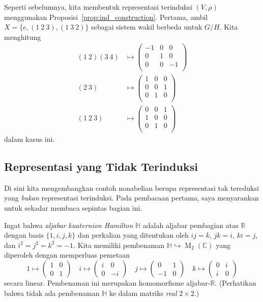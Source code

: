 \documentclass[12pt]{article}
\theoremstyle{plain}
\theoremstyle{definition}
\theoremstyle{remark}
\numberwithin{equation}{section}
\begin{document}
Seperti sebelumnya, kita membentuk representasi terinduksi $(V,\rho)$ menggunakan
Proposisi~\ref{prop:ind_construction}.
Pertama, ambil $X=\{ e, (1\ 2\ 3), (1\ 3\ 2) \}$ sebagai sistem
wakil berbeda untuk $G/H$.
Kita menghitung
\begin{align*}
(1\ 2)(3\ 4)&\mapsto
\begin{pmatrix}
-1 & 0 & 0\\
0 & 1 & 0\\
0 & 0 & -1\\
\end{pmatrix}\\
(2\ 3)&\mapsto
\begin{pmatrix}
1 & 0 & 0\\
0 & 0 & 1\\
0 & 1 & 0\\
\end{pmatrix}\\
(1\ 2\ 3)&\mapsto
\begin{pmatrix}
0 & 0 & 1\\
1 & 0 & 0\\
0 & 1 & 0\\
\end{pmatrix}
\end{align*}
dalam kasus ini.

\subsection{Representasi yang Tidak Terinduksi}

Di sini kita mengembangkan contoh nonabelian berupa representasi tak tereduksi
yang \emph{bukan} representasi terinduksi.
Pada pembacaan pertama, saya menyarankan untuk sekadar membaca sepintas bagian ini.

Ingat bahwa \emph{aljabar kuaternion Hamilton} $\mathbb{H}$
adalah aljabar pembagian atas $\mathbb{R}$
dengan basis $\{1,i,j,k\}$ dan perkalian yang ditentukan oleh
$ij=k$, $jk=i$, $ki=j$, dan $i^2=j^2=k^2=-1$.
Kita memiliki pembenaman
$\mathbb{H} \hookrightarrow \operatorname{M}_2(\mathbb{C})$
yang diperoleh dengan memperluas pemetaan
\[
1 \mapsto \begin{pmatrix} 1&0\\0&1 \end{pmatrix} \quad
i \mapsto \begin{pmatrix} i&0\\0&-i \end{pmatrix} \quad
j \mapsto \begin{pmatrix} 0&1\\-1&0 \end{pmatrix} \quad
k \mapsto \begin{pmatrix} 0&i\\i&0 \end{pmatrix}
\]
secara linear.
Pembenaman ini merupakan homomorfisme aljabar-$\mathbb{R}$.
(Perhatikan bahwa tidak ada pembenaman $\mathbb{H}$ ke dalam
matriks \emph{real} $2\times 2$.)
\end{document}
